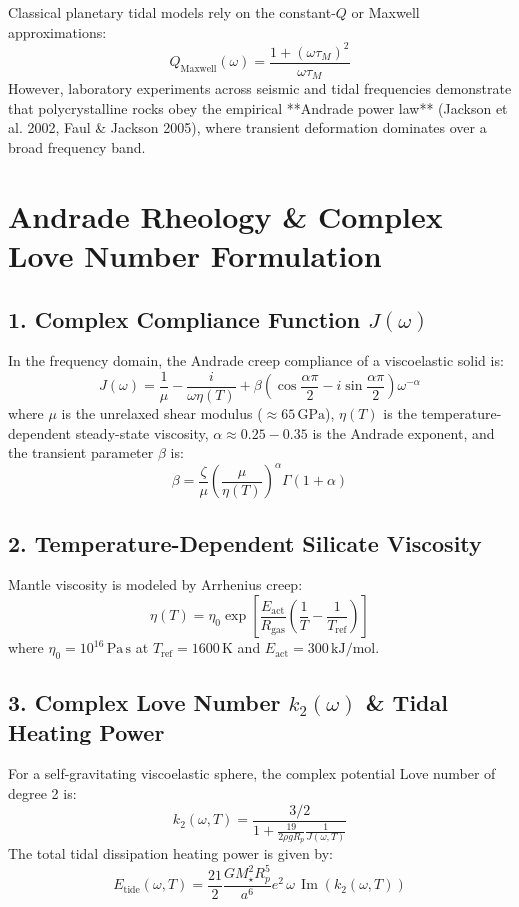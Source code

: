 \documentclass[11pt,a4paper]{article}
\begin{document}
Classical planetary tidal models rely on the constant-$Q$ or Maxwell approximations:
\begin{equation}
Q_{\text{Maxwell}}(\omega) = \frac{1 + (\omega \tau_M)^2}{\omega \tau_M}
\end{equation}
However, laboratory experiments across seismic and tidal frequencies demonstrate that polycrystalline rocks obey the empirical **Andrade power law** (Jackson et al. 2002, Faul \& Jackson 2005), where transient deformation dominates over a broad frequency band.

\section{Andrade Rheology \& Complex Love Number Formulation}

\subsection{1. Complex Compliance Function $J(\omega)$}
In the frequency domain, the Andrade creep compliance of a viscoelastic solid is:
\begin{equation}
J(\omega) = \frac{1}{\mu} - \frac{i}{\omega \eta(T)} + \beta (\cos\frac{\alpha\pi}{2} - i \sin\frac{\alpha\pi}{2}) \omega^{-\alpha}
\end{equation}
where $\mu$ is the unrelaxed shear modulus ($\approx 65\,\mathrm{GPa}$), $\eta(T)$ is the temperature-dependent steady-state viscosity, $\alpha \approx 0.25-0.35$ is the Andrade exponent, and the transient parameter $\beta$ is:
\begin{equation}
\beta = \frac{\zeta}{\mu} \left(\frac{\mu}{\eta(T)}\right)^\alpha \Gamma(1 + \alpha)
\end{equation}

\subsection{2. Temperature-Dependent Silicate Viscosity}
Mantle viscosity is modeled by Arrhenius creep:
\begin{equation}
\eta(T) = \eta_0 \exp\left[ \frac{E_{\text{act}}}{R_{\text{gas}}} \left(\frac{1}{T} - \frac{1}{T_{\text{ref}}}\right) \right]
\end{equation}
where $\eta_0 = 10^{16}\,\mathrm{Pa\,s}$ at $T_{\text{ref}} = 1600\,\mathrm{K}$ and $E_{\text{act}} = 300\,\mathrm{kJ/mol}$.

\subsection{3. Complex Love Number $k_2(\omega)$ \& Tidal Heating Power}
For a self-gravitating viscoelastic sphere, the complex potential Love number of degree 2 is:
\begin{equation}
k_2(\omega, T) = \frac{3/2}{ 1 + \frac{19}{2 \rho g R_p} \frac{1}{J(\omega, T)} }
\end{equation}
The total tidal dissipation heating power is given by:
\begin{equation}
E_{\text{tide}}(\omega, T) = \frac{21}{2} \frac{G M_\star^2 R_p^5}{a^6} e^2 \, \omega \, \operatorname{Im}(k_2(\omega, T))
\end{equation}
\end{document}
